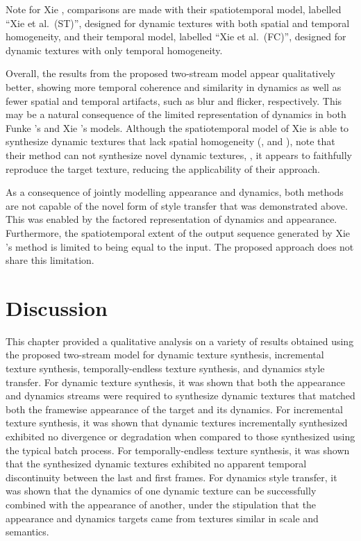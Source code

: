 Note for Xie \etal, comparisons are made with their
spatiotemporal model, labelled ``Xie et al.\ (ST)'', designed for dynamic
textures with both spatial and temporal homogeneity, and their temporal model,
labelled ``Xie et al.\ (FC)'', designed for dynamic textures with only temporal
homogeneity.

\clearpage

\clearpage

Overall, the results from the proposed two-stream model appear
qualitatively better, showing more temporal coherence and similarity
in dynamics as well as fewer spatial and temporal artifacts, such as blur and flicker, respectively.
This may be a natural consequence of the limited representation of dynamics
in both Funke \etal's and Xie \etal's models. Although the spatiotemporal model
of Xie \etal \cite{xie2017synthesizing} is able to synthesize dynamic textures
that lack spatial homogeneity (\eg,  and ),
note that their method can not synthesize novel dynamic textures, \ie, it
appears to faithfully reproduce the target texture, reducing the applicability
of their approach.

As a consequence of jointly modelling appearance and dynamics, both methods \cite{funke2017,xie2017synthesizing} are not capable of the novel form of style
transfer that was demonstrated above. This was enabled by the factored
representation of dynamics and appearance. Furthermore, the spatiotemporal
extent of the output sequence generated by Xie \etal's
\cite{xie2017synthesizing} method is limited to being equal to the input.
The proposed approach does not share this limitation.

\section{Discussion}

This chapter provided a qualitative analysis on a variety of results obtained using the proposed two-stream model for dynamic texture synthesis, incremental texture synthesis, temporally-endless texture synthesis, and dynamics style transfer. For dynamic texture synthesis, it was shown that both the appearance and dynamics streams were required to synthesize dynamic textures that matched both the framewise appearance of the target and its dynamics. For incremental texture synthesis, it was shown that dynamic textures incrementally synthesized exhibited no divergence or degradation when compared to those synthesized using the typical batch process. For temporally-endless texture synthesis, it was shown that the synthesized dynamic textures exhibited no apparent temporal discontinuity between the last and first frames. For dynamics style transfer, it was shown that the dynamics of one dynamic texture can be successfully combined with the appearance of another, under the stipulation that the appearance and dynamics targets came from textures similar in scale and semantics.


